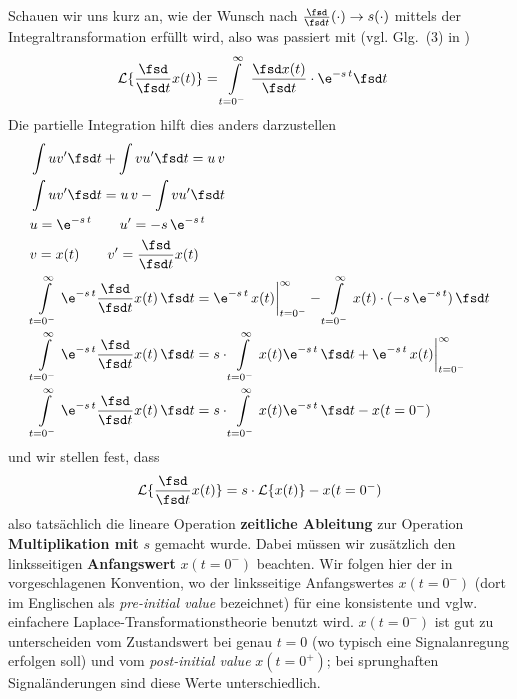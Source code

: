 Schauen wir uns kurz an, wie der Wunsch nach
$\frac{\fsd }{\fsd t} (\cdot) \rightarrow s(\cdot )$
mittels der Integraltransformation erfüllt wird, also was passiert mit (vgl. Glg.~(3) in \cite{Lundberg2007})
\begin{align}
\mathcal{L}\{\frac{\fsd }{\fsd t}  x(t)\} &= \int\limits_{t=0^-}^{\infty} \frac{\fsd x(t)}{\fsd t} \cdot \e^{-s\,t} \fsd t
\end{align}
Die partielle Integration hilft dies anders darzustellen
\begin{align}
&\int u v' \fsd t + \int v u' \fsd t = u\,v\\
&\int u v' \fsd t = u\,v - \int v u' \fsd t\\
&u = \e^{-s\,t}\qquad u' = -s\,\e^{-s\,t}\\
&v = x(t)\qquad v' = \frac{\fsd }{\fsd t}  x(t)\\
&\int\limits_{t=0^-}^{\infty} \e^{-s\,t} \frac{\fsd }{\fsd t}  x(t) \, \fsd t
= \e^{-s\,t}\,x(t)\bigg|_{t=0^-}^{\infty} - \int\limits_{t=0^-}^{\infty} x(t) \cdot (-s\,\e^{-s\,t}) \, \fsd t\\
&\int\limits_{t=0^-}^{\infty} \e^{-s\,t} \frac{\fsd }{\fsd t}  x(t) \, \fsd t
= s \cdot \int\limits_{t=0^-}^{\infty} x(t) \e^{-s\,t} \, \fsd t
+\e^{-s\,t}\,x(t)\bigg|_{t=0^-}^{\infty}\\
&\int\limits_{t=0^-}^{\infty} \e^{-s\,t} \frac{\fsd }{\fsd t}  x(t) \, \fsd t
= s \cdot \int\limits_{t=0^-}^{\infty} x(t) \e^{-s\,t} \, \fsd t - x(t=0^-)
\end{align}
und wir stellen fest, dass
\begin{align}
\label{eq:laplace_diff_satz}
\mathcal{L}\{\frac{\fsd }{\fsd t}  x(t)\}  = s \cdot \mathcal{L}\{x(t)\} - x(t=0^-)
\end{align}
also tatsächlich die lineare Operation \textbf{zeitliche Ableitung} zur Operation
\textbf{Multiplikation mit} $s$ gemacht wurde. Dabei müssen wir zusätzlich den
linksseitigen \textbf{Anfangswert} $x(t=0^-)$ beachten.
Wir folgen hier der in \cite{Lundberg2007}
vorgeschlagenen Konvention, wo der linksseitige Anfangswertes $x(t=0^-)$
(dort im Englischen als \textit{pre-initial value} bezeichnet) für eine
konsistente und vglw. einfachere Laplace-Transformationstheorie benutzt wird.
$x(t=0^-)$ ist gut zu unterscheiden vom Zustandswert bei genau $t=0$ (wo typisch
eine Signalanregung erfolgen soll) und vom
\textit{post-initial value} $x(t=0^+)$; bei sprunghaften Signaländerungen
sind diese Werte unterschiedlich.

